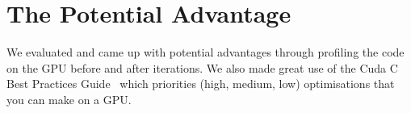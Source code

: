 \section{The Potential Advantage}
We evaluated and came up with potential advantages through profiling the code on the GPU before and after iterations.
We also made great use of the Cuda C Best Practices Guide~\cite{best_practices} which priorities (high, medium, low) optimisations that you can make on a GPU.